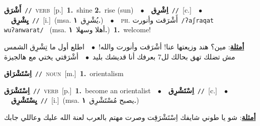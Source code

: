 \documentclass[10pt,a4paper,twoside]{article} %
\begin{document}
\begin{multicols}{2}
{\setlength\topsep{0pt}\textbf{\foreignlanguage{arabic}{أَشْرَق}}\ {\color{gray}\texttt{//}\color{black}}\ \textsc{verb}\ [p.]\ \textbf{1.}~shine  \textbf{2.}~rise (sun)\ \ $\bullet$\ \ \setlength\topsep{0pt}\textbf{\foreignlanguage{arabic}{اِشْرِق}}\ {\color{gray}\texttt{//}\color{black}}\ [c.]\ \ $\bullet$\ \ \setlength\topsep{0pt}\textbf{\foreignlanguage{arabic}{يِشْرِق}}\ {\color{gray}\texttt{//}\color{black}}\ [i.]\ \color{gray}(msa. \foreignlanguage{arabic}{يُشْرِق}~\foreignlanguage{arabic}{\textbf{١.}})\color{black}\ \ $\bullet$\ \ \textsc{ph.} \color{gray} \foreignlanguage{arabic}{أَشْرَقت وأنورت}\color{black}\ {\color{gray}\texttt{/{\sffamily ʔaʃraqat wuʔanwarat}/}\color{black}}\ \color{gray} (msa. \foreignlanguage{arabic}{أهلا وسهلا}~\foreignlanguage{arabic}{\textbf{١.}})\color{black}\ \textbf{1.}~welcome!\  \begin{flushright}\color{gray}\foreignlanguage{arabic}{\textbf{\underline{\foreignlanguage{arabic}{أمثلة}}}: مين؟ هند وزيعتها عنا! أشْرَقت وأنورت والله!\ $\bullet$\ \  اطلع أول ما تِشْرِق الشمس مش تضلك تهق بحالك لل7 بعرفك أنا قديشك بليد\ $\bullet$\ \  أشْرَقتي يختي مع هالجيزة}\end{flushright}\color{black}} \vspace{2mm}

{\setlength\topsep{0pt}\textbf{\foreignlanguage{arabic}{اِسْتَشْرَاق}}\ {\color{gray}\texttt{//}\color{black}}\ \textsc{noun}\ [m.]\ \textbf{1.}~orientalism\ } \vspace{2mm}

{\setlength\topsep{0pt}\textbf{\foreignlanguage{arabic}{اِسْتَشْرَق}}\ {\color{gray}\texttt{//}\color{black}}\ \textsc{verb}\ [p.]\ \textbf{1.}~become an orientalist\ \ $\bullet$\ \ \setlength\topsep{0pt}\textbf{\foreignlanguage{arabic}{اِسْتَشْرِق}}\ {\color{gray}\texttt{//}\color{black}}\ [c.]\ \ $\bullet$\ \ \setlength\topsep{0pt}\textbf{\foreignlanguage{arabic}{يِسْتَشْرِق}}\ {\color{gray}\texttt{//}\color{black}}\ [i.]\ \color{gray}(msa. \foreignlanguage{arabic}{يصبح مُسْتَشْرِق}~\foreignlanguage{arabic}{\textbf{١.}})\color{black}\  \begin{flushright}\color{gray}\foreignlanguage{arabic}{\textbf{\underline{\foreignlanguage{arabic}{أمثلة}}}: شو يا طوني شايفك اِسْتَشْرَقِت وصرت مهتم بالعرب لعنة الله عليك وعاللي جابك}\end{flushright}\color{black}} \vspace{2mm}


\end{multicols}
\end{document}

